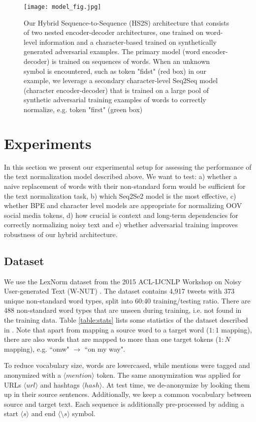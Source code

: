 \documentclass[letterpaper]{article} \usepackage{aaai19}  \usepackage{times}  \usepackage{helvet} \usepackage{courier}  \usepackage[hyphens]{url}  \usepackage{graphicx} \urlstyle{rm} \def\UrlFont{\rm}  \usepackage{graphicx}  \frenchspacing  \setlength{\pdfpagewidth}{8.5in}  \setlength{\pdfpageheight}{11in}
\newcommand{\citep}{\cite}
\begin{document}
\begin{figure*}
    \centering
    \texttt{[image: model\_fig.jpg]}
    \caption{Our Hybrid Sequence-to-Sequence (HS2S) architecture that consists of two nested encoder-decoder architectures, one trained on word-level information and a character-based trained on synthetically generated adversarial examples. The primary model (word encoder-decoder) is trained on sequences of words. When an unknown symbol is encountered, such as token "fidst" (red box) in our example, we leverage a secondary character-level Seq2Seq model (character encoder-decoder) that is trained on a large pool of synthetic adversarial training examples of words to correctly normalize, e.g. token "first" (green box)}
    \label{fig:model}
\end{figure*}

\section{Experiments}\label{sec:exp}
In this section we present our experimental setup for assessing the performance of the text normalization model described above. 
We want to test: a) whether a naive replacement of words with their non-standard form would be sufficient for the text normalization task, b) which Seq2Se2 model is the most effective, c) whether BPE and character level models are appropriate for normalizing OOV social media tokens, d) how crucial is context and long-term dependencies for correctly normalizing noisy text and e) whether adversarial training improves robustness of our hybrid architecture.

\subsection{Dataset}
We use the LexNorm dataset from the 2015 ACL-IJCNLP Workshop on Noisy User-generated Text (W-NUT) \citep{baldwin2015shared}. The dataset contains 4,917 tweets with 373 unique non-standard word types, split into 60:40 training/testing ratio. There are 488 non-standard word types that are unseen during training, i.e. not found in the training data. Table \ref{table:stats} lists some statistics of the dataset described in \citep{baldwin2015shared}. Note that apart from mapping a source word to a target word ($1:1$ mapping), there are also words that are mapped to more than one target tokens ($1:N$ mapping), e.g. ``omw" $\rightarrow$ ``on my way".

To reduce vocabulary size, words are lowercased, while mentions were tagged and anonymized with a $\langle mention \rangle$ token. The same anonymization was applied for URLs $\langle url \rangle$ and hashtags $\langle hash\rangle$. At test time, we de-anonymize by looking them up in their source sentences. Additionally, we keep a common vocabulary between source and target text. Each sequence is additionally pre-processed by adding a start $\langle s\rangle$ and end $\langle \setminus s \rangle$ symbol.
\end{document}
